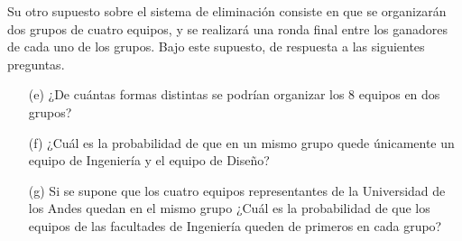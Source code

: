 \documentclass[11pt, spanish]{article}
\begin{document}
Su otro supuesto sobre el sistema de eliminación consiste en que se organizarán dos grupos de
cuatro equipos, y se realizará una ronda final entre los ganadores de cada uno de los grupos. Bajo
este supuesto, de respuesta a las siguientes preguntas.

\begin{itemize}
\item[(e)] ¿De cuántas formas distintas se podrían organizar los 8 equipos en dos grupos?

\item[(f)]  ¿Cuál es la probabilidad de que en un mismo grupo quede únicamente un equipo de
Ingeniería y el equipo de Diseño?

\item[(g)]  Si se supone que los cuatro equipos representantes de la Universidad de los Andes
quedan en el mismo grupo ¿Cuál es la probabilidad de que los equipos de las facultades de
Ingeniería queden de primeros en cada grupo?
\end{itemize}
\end{document}

